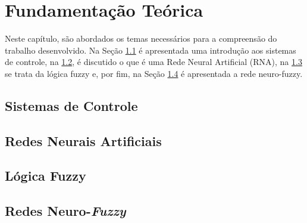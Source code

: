 %
%

\chapter{Fundamentação Teórica}
\label{chap:fundamentacaoTeorica}

Neste capítulo, são abordados os temas necessários para a compreensão do trabalho desenvolvido. Na Seção \ref{sec:fundamentacaoTeorica-sistemas-controle} é apresentada uma introdução aos sistemas de controle, na \ref{sec:fundamentacaoTeorica-rna}, é discutido o que é uma Rede Neural Artificial (RNA), na \ref{sec:fundamentacaoTeorica-fuzzy} se trata da lógica fuzzy e, por fim, na Seção \ref{sec:fundamentacaoTeorica-neuro-fuzzy} é apresentada a rede neuro-fuzzy.

\section{Sistemas de Controle}
\label{sec:fundamentacaoTeorica-sistemas-controle}



\section{Redes Neurais Artificiais}
\label{sec:fundamentacaoTeorica-rna}



\section{Lógica Fuzzy}
\label{sec:fundamentacaoTeorica-fuzzy}



\section{Redes Neuro-\textit{Fuzzy}}
\label{sec:fundamentacaoTeorica-neuro-fuzzy}
%



